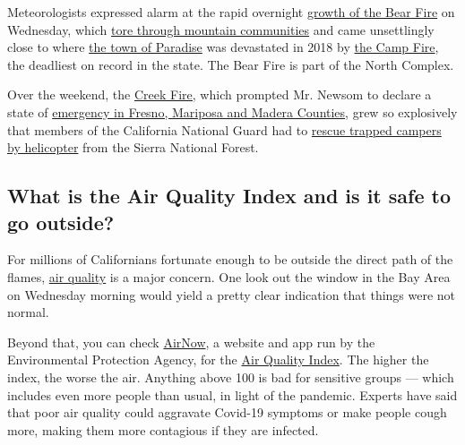 Meteorologists expressed alarm at the rapid overnight
\href{https://krcrtv.com/news/local/thousands-scramble-to-escape-bear-fire-as-it-approaches-lake-oroville}{growth
of the Bear Fire} on Wednesday, which
\href{https://www.nytimes3xbfgragh.onion/2020/09/10/us/wildfires-live-updates.html?\#link-7479402}{tore
through mountain communities} and came unsettlingly close to where
\href{https://www.mercurynews.com/2020/09/09/panic-in-paradise-nearby-bear-fire-triggers-locals-who-lost-everything-in-camp-fire-to-evacuate-again/}{the
town of Paradise} was devastated in 2018 by
\href{https://www.nytimes3xbfgragh.onion/interactive/2018/11/18/us/california-camp-fire-paradise.html}{the
Camp Fire}, the deadliest on record in the state. The Bear Fire is part
of the North Complex.

Over the weekend, the
\href{https://www.fire.ca.gov/incidents/2020/9/4/creek-fire/}{Creek
Fire,} which prompted Mr. Newsom to declare a state of
\href{https://www.nytimes3xbfgragh.onion/2020/09/08/us/california-wildfire-heat-wave.html?name=styln-california-wildfires\&region=TOP_BANNER\&block=storyline_menu_recirc\&action=click\&pgtype=Article\&impression_id=453ed154-f258-11ea-86d9-af7918bbd709\&variant=1_Show}{emergency
in Fresno, Mariposa and Madera Counties}, grew so explosively that
members of the California National Guard had to
\href{https://www.nytimes3xbfgragh.onion/2020/09/08/us/california-wildfires-helicopter-rescue.html?}{rescue
trapped campers by helicopter} from the Sierra National Forest.

\hypertarget{what-is-the-air-quality-index-and-is-it-safe-to-go-outside}{%
\subsection{What is the Air Quality Index and is it safe to go
outside?}\label{what-is-the-air-quality-index-and-is-it-safe-to-go-outside}}

For millions of Californians fortunate enough to be outside the direct
path of the flames,
\href{https://www.nytimes3xbfgragh.onion/2020/09/11/climate/california-smoke-wildfires.html}{air
quality} is a major concern. One look out the window in the Bay Area on
Wednesday morning would yield a pretty clear indication that things were
not normal.

Beyond that, you can check
\href{https://www.nytimes3xbfgragh.onion/2020/09/01/us/ca-air-quality-index.html}{AirNow},
a website and app run by the Environmental Protection Agency, for the
\href{https://www.nytimes3xbfgragh.onion/2020/09/01/us/ca-air-quality-index.html}{Air
Quality Index}. The higher the index, the worse the air. Anything above
100 is bad for sensitive groups --- which includes even more people than
usual, in light of the pandemic. Experts have said that poor air quality
could aggravate Covid-19 symptoms or make people cough more, making them
more contagious if they are infected.

